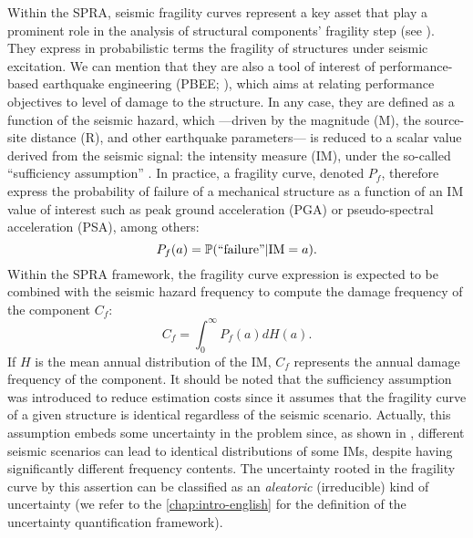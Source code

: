 Within the SPRA, seismic fragility curves represent a key asset that play a prominent role in the analysis of structural components' fragility step (see  \cite{epri_advanced_2011}).
They express in probabilistic terms the fragility of structures under seismic excitation. We can mention that they are also a tool of interest of performance-based earthquake engineering (PBEE; \cite{ghobarah_performance-based_2001,noh_development_2014}), 
which aims at relating performance objectives to level of damage to the structure.
In any case, they are defined as a function of the seismic hazard, which ---driven by the magnitude (M), the source-site distance (R), and other earthquake parameters--- is reduced to a scalar value derived from the seismic signal: the intensity measure (IM), under the so-called ``sufficiency assumption'' \citep{cornell_hazard_2004,luco_structure-specific_2007}.
In practice, a fragility curve, denoted $P_f$, therefore express the probability of failure of a mechanical structure as a function of an IM value of interest such as peak ground acceleration (PGA) or pseudo-spectral acceleration (PSA), among others:
    \begin{equation}
        P_f(a) = \mathbb{P}(\text{``failure''}|\text{IM}=a).
    \end{equation}
Within the SPRA framework, the fragility curve expression is expected to be combined with the seismic hazard frequency to compute the damage frequency of the component $C_f$:
    \begin{equation}
        C_f =  \int_0^\infty P_f(a)dH(a).
    \end{equation}
If $H$ is the mean annual  distribution of the IM, $C_f$ represents the annual damage frequency of the component.
It should be noted that the sufficiency assumption was introduced to reduce estimation costs since it assumes that the fragility curve of a given structure is identical regardless of the seismic scenario.
Actually, this assumption embeds some uncertainty in the problem since, as shown in \cite{radu_earthquake-source-based_2018,grigoriu_are_2021}, different seismic scenarios can lead to identical distributions of some IMs, despite having significantly different frequency contents.
The uncertainty rooted in the fragility curve by this assertion can be classified as an \emph{aleatoric} (irreducible) kind of uncertainty
 (we refer to the \cref{chap:intro-english} for the definition of the uncertainty quantification framework).



